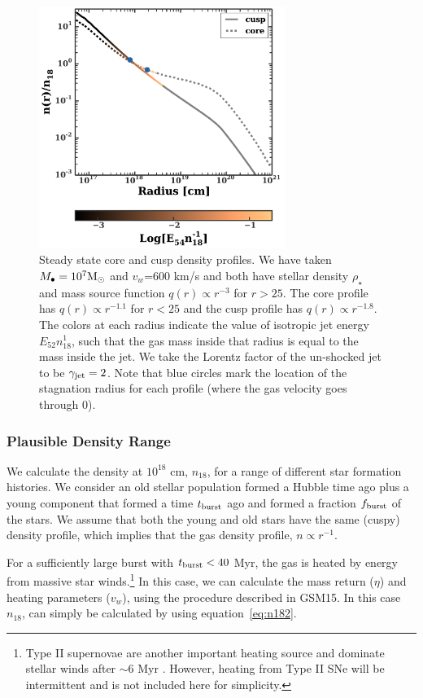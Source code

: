 \documentclass[usenatbib,fleqn]{mnras}
\newcommand{\Mbh}[1][]{M_{\bullet#1}}
\newcommand{\Msun}{{\rm M_\odot}}
\begin{document}
\begin{figure}
\includegraphics[width=8cm]{sedov_radius.pdf}
\caption{\label{fig:profiles} Steady state core and cusp density
  profiles. We have taken $\Mbh=10^{7} \Msun$ and $v_w$=600 km/s and
  both have stellar density $\rho_\star$ and mass source function
  $q(r) \propto r^{-3}$ for $r > 25$. The core profile has $q(r)
  \propto r^{-1.1}$ for $r < 25$ and the cusp profile has $q(r)
  \propto r^{-1.8}$.  The colors at each radius indicate the value of
  isotropic jet energy $E_{52} n_{18}^{1}$, such that the gas mass
  inside that radius is equal to the mass inside the jet. We take the
  Lorentz factor of the un-shocked jet to be $\gamma_{\rm jet}=2$.
  Note that blue circles mark the location of the stagnation radius
  for each profile (where the gas velocity goes through 0).}
\end{figure}



\subsubsection{Plausible Density Range}
\label{sec:densAllowed}

We calculate the density at $10^{18}$ cm, $n_{18}$, for a range of
different star formation histories. We consider an old stellar
population formed a Hubble time ago plus a young component that formed
a time $t_{\rm burst}$ ago and formed a fraction $f_{\rm burst}$ of
the stars. We assume that both the young and old stars have the same
(cuspy) density profile, which implies that the gas density profile,
$n\propto r^{-1}$.

For a sufficiently large burst with $t_{\rm burst}<40$ Myr, the gas is
heated by energy from massive star winds.\footnote{Type II supernovae
  are another important heating source and dominate stellar winds
  after $\sim$6 Myr \citep{Voss+2009}. However, heating from Type II SNe
  will be intermittent and is not included here for simplicity.} In
this case, we can calculate the mass return ($\eta$) and heating
parameters ($v_w$), using the procedure described in GSM15. In this
case $n_{18}$, can simply be calculated by using
equation~\eqref{eq:n182}.
\end{document}
